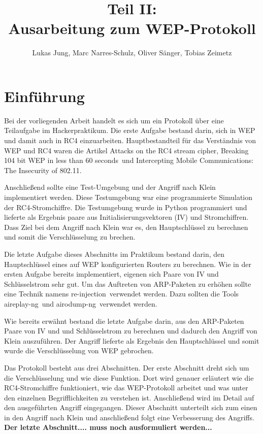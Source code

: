 \documentclass[10pt,a4paper]{article}
\title{Teil II:\\Ausarbeitung zum WEP-Protokoll}
\author{Lukas Jung, Marc Narres-Schulz, Oliver Sänger, Tobias Zeimetz}
\begin{document}
\maketitle
\tableofcontents
\newpage

\section{Einführung}
Bei der vorliegenden Arbeit handelt es sich um ein Protokoll über eine Teilaufgabe im \glqq Hackerpraktikum\grqq. Die erste Aufgabe bestand darin, sich in WEP und damit auch in RC4 einzuarbeiten. Hauptbestandteil für das Verständnis von WEP und RC4 waren die Artikel \glqq Attacks on the RC4 stream cipher\grqq, \glqq Breaking 104 bit WEP in less than 60 seconds\grqq \ und \glqq Intercepting Mobile Communications: The Insecurity of 802.11\grqq.

Anschließend sollte eine Test-Umgebung und der Angriff nach Klein implementiert werden. Diese Testumgebung war eine programmierte Simulation der RC4-Stromchiffre. Die Testumgebung wurde in Python programmiert und lieferte als Ergebnis paare aus Initialisierungsvektoren (IV) und Stromchiffren. Dass Ziel bei dem Angriff nach Klein war es, den Hauptschlüssel zu berechnen und somit die Verschlüsselung zu brechen. 

Die letzte Aufgabe dieses Abschnitts im Praktikum bestand darin, den Hauptschlüssel eines auf WEP konfigurierten Routers zu berechnen. Wie in der ersten Aufgabe bereits implementiert, eigenen sich Paare von IV und Schlüsselstrom sehr gut. Um das Auftreten von ARP-Paketen zu erhöhen sollte eine Technik namens \glqq re-injection\grqq \ verwendet werden.  Dazu sollten die Tools \glqq aireplay-ng\grqq \ und \glqq airodump-ng\grqq \ verwendet werden.

Wie bereits erwähnt bestand die letzte Aufgabe darin, aus den ARP-Paketen Paare von IV und und Schlüsselstrom zu berechnen und dadurch den Angriff von Klein auszuführen. Der Angriff lieferte als Ergebnis den Hauptschlüssel und somit wurde die Verschlüsselung von WEP gebrochen.

Das Protokoll besteht aus drei Abschnitten. Der erste Abschnitt dreht sich um die Verschlüsselung und wie diese Funktion. Dort wird genauer erläutert wie die RC4-Stromchiffre funktioniert, wie das WEP-Protokoll arbeitet und was unter den einzelnen Begrifflichkeiten zu verstehen ist. Anschließend wird im Detail auf den ausgeführten Angriff eingegangen. Dieser Abschnitt unterteilt sich zum einen in den Angriff nach Klein und anschließend folgt eine Verbesserung des Angriffs. \textbf{Der letzte Abschnitt.... muss noch ausformuliert werden...}
\end{document}
